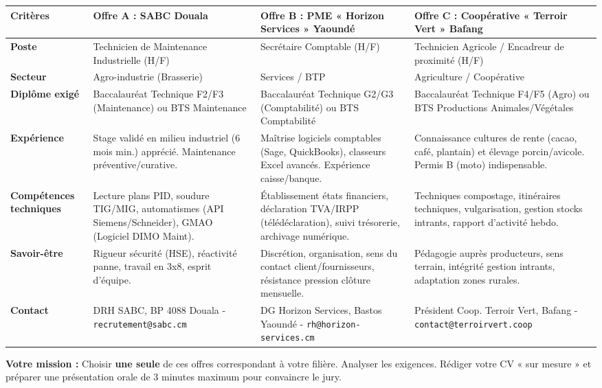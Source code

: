 \documentclass[11pt]{article}
\begin{document}
\begin{center}
\begin{tabularx}{\linewidth}{|>{\bfseries}l|X|X|X|}\hline
\textbf{Critères} & \textbf{Offre A : SABC Douala} & \textbf{Offre B : PME « Horizon Services » Yaoundé} & \textbf{Offre C : Coopérative « Terroir Vert » Bafang} \\ \hline
\textbf{Poste} & Technicien de Maintenance Industrielle (H/F) & Secrétaire Comptable (H/F) & Technicien Agricole / Encadreur de proximité (H/F) \\ \hline
\textbf{Secteur} & Agro-industrie (Brasserie) & Services / BTP & Agriculture / Coopérative \\ \hline
\textbf{Diplôme exigé} & Baccalauréat Technique F2/F3 (Maintenance) ou BTS Maintenance & Baccalauréat Technique G2/G3 (Comptabilité) ou BTS Comptabilité & Baccalauréat Technique F4/F5 (Agro) ou BTS Productions Animales/Végétales \\ \hline
\textbf{Expérience} & Stage validé en milieu industriel (6 mois min.) apprécié. Maintenance préventive/curative. & Maîtrise logiciels comptables (Sage, QuickBooks), classeurs Excel avancés. Expérience caisse/banque. & Connaissance cultures de rente (cacao, café, plantain) et élevage porcin/avicole. Permis B (moto) indispensable. \\ \hline
\textbf{Compétences techniques} & Lecture plans PID, soudure TIG/MIG, automatismes (API Siemens/Schneider), GMAO (Logiciel DIMO Maint). & Établissement états financiers, déclaration TVA/IRPP (télédéclaration), suivi trésorerie, archivage numérique. & Techniques compostage, itinéraires techniques, vulgarisation, gestion stocks intrants, rapport d'activité hebdo. \\ \hline
\textbf{Savoir-être} & Rigueur sécurité (HSE), réactivité panne, travail en 3x8, esprit d'équipe. & Discrétion, organisation, sens du contact client/fournisseurs, résistance pression clôture mensuelle. & Pédagogie auprès producteurs, sens terrain, intégrité gestion intrants, adaptation zones rurales. \\ \hline
\textbf{Contact} & DRH SABC, BP 4088 Douala - \texttt{recrutement@sabc.cm} & DG Horizon Services, Bastos Yaoundé - \texttt{rh@horizon-services.cm} & Président Coop. Terroir Vert, Bafang - \texttt{contact@terroirvert.coop} \\ \hline
\end{tabularx}
\end{center}

\textbf{Votre mission :} Choisir \textbf{une seule} de ces offres correspondant à votre filière. Analyser les exigences. Rédiger votre CV « sur mesure » et préparer une présentation orale de 3 minutes maximum pour convaincre le jury.
\end{document}

